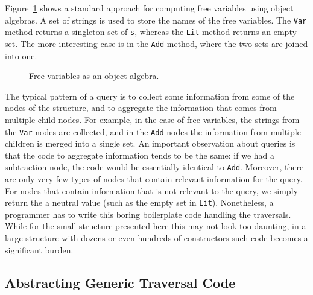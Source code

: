 Figure~\ref{freevars_without_monoid} shows a
standard approach for computing free variables using object algebras.
A set of strings is used to store the names of the free variables. The
\lstinline{Var} method returns a singleton set of \lstinline{s},
whereas the \lstinline{Lit} method returns an empty set. The
more interesting case is in the \lstinline{Add} method, where the two
sets are joined into one.

\begin{figure}[tb]
\vspace{-.1in}
\caption{Free variables as an object algebra.}
\label{freevars_without_monoid}
\end{figure}
\begin{comment}
\bruno{put code in a figure, add a caption and refer
  to the figure in the text.}
\end{comment}

The typical pattern of a query is to collect some information from
some of the nodes of the structure, and to aggregate the information
that comes from multiple child nodes. For example, in the case of free
variables, the strings from the \lstinline{Var} nodes are collected,
and in the \lstinline{Add} nodes the information from multiple
children is merged into a single set. An important observation about
queries is that the code to aggregate information tends to be the
same: if we had a subtraction node, the code would be essentially
identical to \lstinline{Add}. Moreover, there are only very few types
of nodes that contain relevant information for the query. For nodes
that contain information that is not relevant to the query, we simply
return the a neutral value (such as the empty set in \lstinline{Lit}).
Nonetheless, a programmer has to write this boring boilerplate code
handling the traversals.  While for the small structure presented here
this may not look too daunting, in a large structure with dozens or
even hundreds of constructors such code becomes a significant burden.


\subsection{Abstracting Generic Traversal Code}\label{subsec:genericquery}

